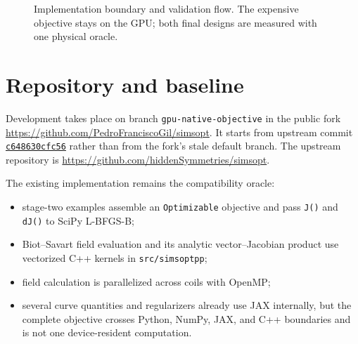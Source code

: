 \documentclass[11pt,a4paper]{article}
\newcommand{\code}[1]{\texttt{#1}}
\begin{document}
\begin{figure}[htbp]
\centering
{}
\caption{Implementation boundary and validation flow.  The expensive objective
stays on the GPU; both final designs are measured with one physical oracle.}
\label{fig:architecture}
\end{figure}

\section{Repository and baseline}

Development takes place on branch \code{gpu-native-objective} in the public
fork \url{https://github.com/PedroFranciscoGil/simsopt}.  It starts from
upstream commit
\href{https://github.com/hiddenSymmetries/simsopt/commit/c648630cfc5625863b291709c17015bcdcba13af}{\code{c648630cfc56}}
rather than from the fork's
stale default branch.  The upstream repository is
\url{https://github.com/hiddenSymmetries/simsopt}.

The existing implementation remains the compatibility oracle:
\begin{itemize}
  \item stage-two examples assemble an \code{Optimizable} objective and pass
        \code{J()} and \code{dJ()} to SciPy L-BFGS-B;
  \item Biot--Savart field evaluation and its analytic vector--Jacobian product
        use vectorized C++ kernels in \code{src/simsoptpp};
  \item field calculation is parallelized across coils with OpenMP;
  \item several curve quantities and regularizers already use JAX internally,
        but the complete objective crosses Python, NumPy, JAX, and C++
        boundaries and is not one device-resident computation.
\end{itemize}
\end{document}
